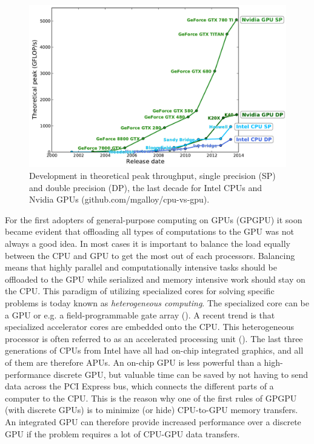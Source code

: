 \begin{figure}[t!]
\centering
\includegraphics[width=\textwidth]{img/cpu_vs_gpu.pdf}
\caption{Development in theoretical peak throughput, single precision (SP) and double precision (DP), the last decade for Intel CPUs and Nvidia GPUs (github.com/mgalloy/cpu-vs-gpu).}
\label{fig:cpu_vs_gpu}
\end{figure}

For the first adopters of general-purpose computing on GPUs (GPGPU) it soon became evident that offloading all types of computations to the GPU was not always a good idea. In most cases it is important to balance the load equally between the CPU and GPU to get the most out of each processors. Balancing means that highly parallel and computationally intensive tasks should be offloaded to the GPU while serialized and memory intensive work should stay on the CPU. This paradigm of utilizing specialized cores for solving specific problems is today known as \textit{heterogeneous computing}. The specialized core can be a GPU or e.g. a field-programmable gate array (). A recent trend is that specialized accelerator cores are embedded onto the CPU. This heterogeneous processor is often referred to as an accelerated processing unit (). The last three generations of CPUs from Intel have all had on-chip integrated graphics, and all of them are therefore APUs. An on-chip GPU is less powerful than a high-performance discrete GPU, but valuable time can be saved by not having to send data across the PCI Express bus, which connects the different parts of a computer to the CPU. This is the reason why one of the first rules of GPGPU (with discrete GPUs) is to minimize (or hide) CPU-to-GPU memory transfers. An integrated GPU can therefore provide increased performance over a discrete GPU if the problem requires a lot of CPU-GPU data transfers.

